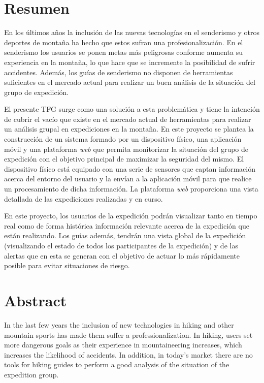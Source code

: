 \chapter{Resumen}

En los últimos años la inclusión de las nuevas tecnologías en el senderismo y otros deportes de montaña ha hecho que estos sufran una profesionalización. En el senderismo los usuarios se ponen metas más peligrosas conforme aumenta su experiencia en la montaña, lo que hace que se incremente la posibilidad de sufrir accidentes. Además, los guías de senderismo no disponen de herramientas suficientes en el mercado actual para realizar un buen análisis de la situación del grupo de expedición.

El presente \ac{TFG} surge como una solución a esta problemática y tiene la intención de cubrir el vacío que existe en el mercado actual de herramientas para realizar un análisis grupal en expediciones en la montaña. En este proyecto se plantea la construcción de un sistema formado por un dispositivo físico, una aplicación móvil y una plataforma \textit{web} que permita monitorizar la situación del grupo de expedición con el objetivo principal de maximizar la seguridad del mismo. El dispositivo físico está equipado con una serie de sensores que captan información acerca del entorno del usuario y la envían a la aplicación móvil para que realice un procesamiento de dicha información. La plataforma \textit{web} proporciona una vista detallada de las expediciones realizadas y en curso.

En este proyecto, los usuarios de la expedición podrán visualizar tanto en tiempo real como de forma histórica información relevante acerca de la expedición que están realizando. Los guías además, tendrán una vista global de la expedición (visualizando el estado de todos los participantes de la expedición) y de las alertas que en esta se generan con el objetivo de actuar lo más rápidamente posible para evitar situaciones de riesgo.

\chapter{Abstract}

In the last few years the inclusion of new technologies in hiking and other mountain sports has made them suffer a professionalization. In hiking, users set more dangerous goals as their experience in mountaineering increases, which increases the likelihood of accidents. In addition, in today's market there are no tools for hiking guides to perform a good analysis of the situation of the expedition group.

